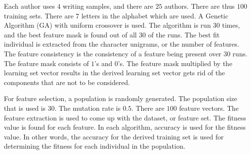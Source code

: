 \documentclass[conference]{IEEEtran}
\begin{document}
Each author uses \begin{math}4\end{math} writing samples, and there are \begin{math}25\end{math} authors. There are thus \begin{math}100\end{math} training sets. There are \begin{math}7\end{math} letters in the alphabet which are used. A Genetic Algorithm (GA) with uniform crossover is used.
The algorithm is run \begin{math}30\end{math} times, and the best feature mask is found out of all \begin{math}30\end{math} of the runs. 
The best fit individual is extracted from the character unigrams, or the number of features. 
The feature consistency is the consistency of a feature being present over \begin{math}30\end{math} runs.%
The feature mask consists of \begin{math}1\end{math}'s and \begin{math}0\end{math}'s. 
The feature mask multiplied by the learning set vector results in the derived learning set vector gets rid of the components that are not to be considered. 

For feature selection, a population is randomly generated. The population size that is used is \begin{math}30\end{math}. The mutation rate is \begin{math}0.5\end{math}. There are \begin{math}100\end{math} feature vectors. The feature extraction is used to come up with the dataset, or feature set. 
The fitness value is found for each feature. In each algorithm, accuracy is used for the fitness value. In other words, the accuracy for the derived training set is used for determining the fitness for each individual in the population. %
\end{document}
